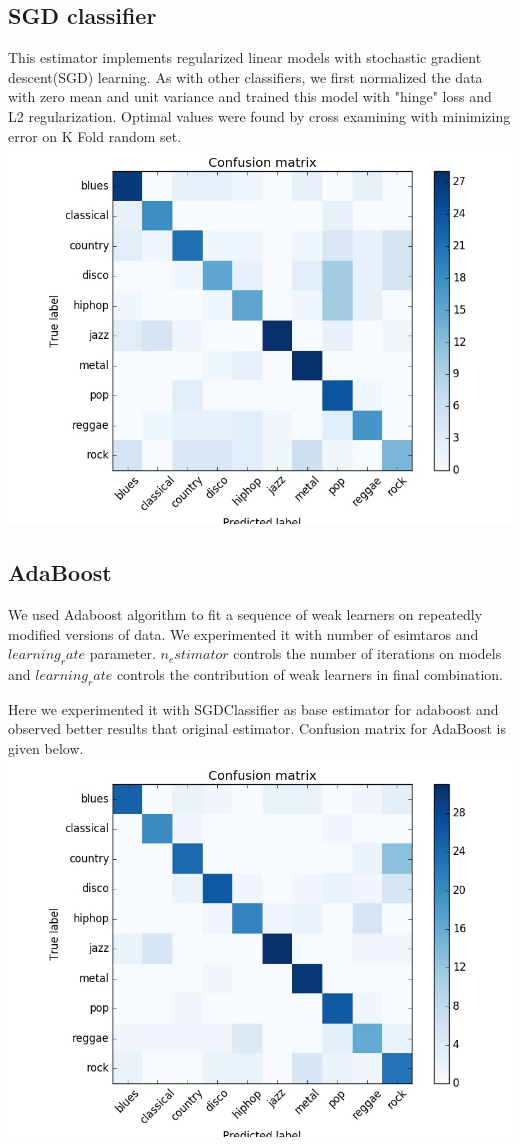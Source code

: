 \documentclass[conference]{IEEEtran}
\begin{document}
\subsection{SGD classifier}
\label{sub:SGD classifier}
This estimator implements regularized linear models with stochastic gradient descent(SGD) learning. As with other classifiers, we first normalized the data with zero mean and unit variance and trained this model with "hinge" loss and L2 regularization. Optimal values were found by cross examining with minimizing error on K Fold random set.
\includegraphics[width=\columnwidth]{SGDCLASSIFIER}

\subsection{AdaBoost}
\label{sub:AdaBoost Classification}
We used Adaboost algorithm to fit a sequence of weak learners on repeatedly modified versions of data. We experimented it with number of esimtaros and $learning_rate$ parameter. $n_estimator$ controls the number of iterations on models and $learning_rate$ controls the contribution of weak learners in final combination.

Here we experimented it with SGDClassifier as base estimator for adaboost and observed better results that original estimator.
Confusion matrix for AdaBoost is given below.
\includegraphics[width=\columnwidth]{ADABOOST}
\end{document}
